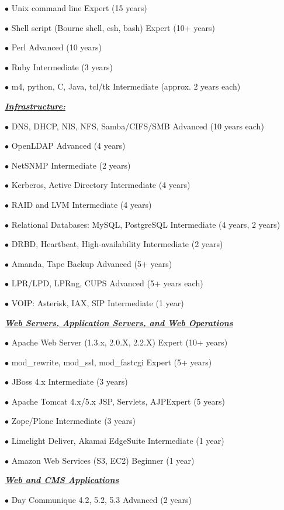 \documentclass{article}
\newcommand{\skillset}[1]{{ \underline{\textbf{\emph{#1}}}\\  }}
\newcommand{\skill}[2]{{$\bullet$ #1 \hfill #2 }}
\begin{document}
\skill{Unix command line}{Expert (15 years)}

\skill{Shell script (Bourne shell, csh, bash)}{Expert (10+ years)}

\skill{Perl}{Advanced (10 years)}

\skill{Ruby}{Intermediate (3 years)}

\skill{m4, python, C, Java, tcl/tk}{Intermediate (approx. 2 years each)}



\skillset{Infrastructure: }

\skill{DNS, DHCP, NIS, NFS, Samba/CIFS/SMB}{Advanced (10 years each)}

\skill{OpenLDAP}{Advanced (4 years)}

\skill{NetSNMP}{Intermediate (2 years)}

\skill{Kerberos, Active Directory}{Intermediate (4 years)}

\skill{RAID and LVM}{Intermediate (4 years)}

\skill{Relational Databases: MySQL, PostgreSQL}{Intermediate (4 years, 2 years)}

\skill{DRBD, Heartbeat, High-availability}{Intermediate (2 years)}

\skill{Amanda, Tape Backup}{Advanced (5+ years)}

\skill{LPR/LPD, LPRng, CUPS}{Advanced (5+ years each)}

\skill{VOIP: Asterisk, IAX, SIP}{Intermediate (1 year)}



\skillset{Web Servers, Application Servers, and Web Operations}

\skill{Apache Web Server (1.3.x, 2.0.X, 2.2.X)}{Expert (10+ years)}

\skill{mod\_rewrite, mod\_ssl, mod\_fastcgi}{Expert (5+ years)}

\skill{JBoss 4.x}{Intermediate (3 years)}

\skill{Apache Tomcat 4.x/5.x}

\skill{JSP, Servlets, AJP}{Expert (5 years)}

\skill{Zope/Plone}{Intermediate (3 years)}

\skill{Limelight Deliver, Akamai EdgeSuite}{Intermediate (1 year)}

\skill{Amazon Web Services (S3, EC2)}{Beginner (1 year)}



\skillset{Web and CMS Applications}

\skill{Day Communique 4.2, 5.2, 5.3}{Advanced (2 years)}
\end{document}
